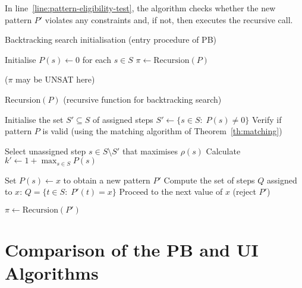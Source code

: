 \documentclass[runningheads,proof]{llncs}
\begin{document}
In line~\ref{line:pattern-eligibility-test}, the algorithm checks whether the new pattern $P'$ violates any constraints and, if not, then executes the recursive call.




\begin{algorithm}[tb]
\caption{Backtracking search initialisation (entry procedure of PB)\label{alg:start}}

Initialise $P(s) \gets 0$ for each $s \in S$\;
$\pi \gets \text{Recursion}(P)$\;

\Return{$\pi$} ($\pi$ may be UNSAT here)\;
\end{algorithm}

{\small
\begin{algorithm}[tb]
\caption{Recursion$(P)$ (recursive function for backtracking search)\label{alg:recursion}}
Initialise the set $S' \subseteq S$ of assigned steps $S' \gets \{ s \in S :\; P(s) \neq 0 \}$\;
{
	Verify if pattern $P$ is valid (using the matching algorithm of Theorem~\ref{th:matching})\;
	{
		\;
	}
	\Else
	{
		\;
	}
}
\Else
{
	Select unassigned step $s \in S \setminus S'$ that maximises $\rho(s)$\; \label{line:select-s}
	Calculate $k' \gets 1 + \max_{s \in S} P(s)$\;
	{
		Set $P(s) \gets x$ to obtain a new pattern $P'$\; \label{line:extend-pattern}
		Compute the set of steps $Q$ assigned to $x$: $Q = \{ t \in S :\; P'(t) = x \}$\; \label{line:authorisation-heuristic-begin}
		{
			Proceed to the next value of $x$ (reject $P'$)\; \label{line:authorisation-heuristic-end}
		}
		
		{\label{line:pattern-eligibility-test}
			$\pi \gets \text{Recursion}(P')$\;
			{
				\Return{$\pi$}\;
			}
		}
	}
}

\;
\end{algorithm}
}





\section{Comparison of the PB and UI Algorithms} 
\label{sec:comparison}
\end{document}

